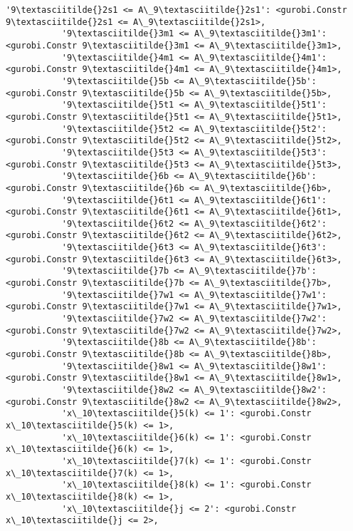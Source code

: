 \documentclass[11pt]{article}
\begin{document}
\begin{Verbatim}[commandchars=\\\{\}]
           '9\textasciitilde{}2s1 <= A\_9\textasciitilde{}2s1': <gurobi.Constr 9\textasciitilde{}2s1 <= A\_9\textasciitilde{}2s1>,
           '9\textasciitilde{}3m1 <= A\_9\textasciitilde{}3m1': <gurobi.Constr 9\textasciitilde{}3m1 <= A\_9\textasciitilde{}3m1>,
           '9\textasciitilde{}4m1 <= A\_9\textasciitilde{}4m1': <gurobi.Constr 9\textasciitilde{}4m1 <= A\_9\textasciitilde{}4m1>,
           '9\textasciitilde{}5b <= A\_9\textasciitilde{}5b': <gurobi.Constr 9\textasciitilde{}5b <= A\_9\textasciitilde{}5b>,
           '9\textasciitilde{}5t1 <= A\_9\textasciitilde{}5t1': <gurobi.Constr 9\textasciitilde{}5t1 <= A\_9\textasciitilde{}5t1>,
           '9\textasciitilde{}5t2 <= A\_9\textasciitilde{}5t2': <gurobi.Constr 9\textasciitilde{}5t2 <= A\_9\textasciitilde{}5t2>,
           '9\textasciitilde{}5t3 <= A\_9\textasciitilde{}5t3': <gurobi.Constr 9\textasciitilde{}5t3 <= A\_9\textasciitilde{}5t3>,
           '9\textasciitilde{}6b <= A\_9\textasciitilde{}6b': <gurobi.Constr 9\textasciitilde{}6b <= A\_9\textasciitilde{}6b>,
           '9\textasciitilde{}6t1 <= A\_9\textasciitilde{}6t1': <gurobi.Constr 9\textasciitilde{}6t1 <= A\_9\textasciitilde{}6t1>,
           '9\textasciitilde{}6t2 <= A\_9\textasciitilde{}6t2': <gurobi.Constr 9\textasciitilde{}6t2 <= A\_9\textasciitilde{}6t2>,
           '9\textasciitilde{}6t3 <= A\_9\textasciitilde{}6t3': <gurobi.Constr 9\textasciitilde{}6t3 <= A\_9\textasciitilde{}6t3>,
           '9\textasciitilde{}7b <= A\_9\textasciitilde{}7b': <gurobi.Constr 9\textasciitilde{}7b <= A\_9\textasciitilde{}7b>,
           '9\textasciitilde{}7w1 <= A\_9\textasciitilde{}7w1': <gurobi.Constr 9\textasciitilde{}7w1 <= A\_9\textasciitilde{}7w1>,
           '9\textasciitilde{}7w2 <= A\_9\textasciitilde{}7w2': <gurobi.Constr 9\textasciitilde{}7w2 <= A\_9\textasciitilde{}7w2>,
           '9\textasciitilde{}8b <= A\_9\textasciitilde{}8b': <gurobi.Constr 9\textasciitilde{}8b <= A\_9\textasciitilde{}8b>,
           '9\textasciitilde{}8w1 <= A\_9\textasciitilde{}8w1': <gurobi.Constr 9\textasciitilde{}8w1 <= A\_9\textasciitilde{}8w1>,
           '9\textasciitilde{}8w2 <= A\_9\textasciitilde{}8w2': <gurobi.Constr 9\textasciitilde{}8w2 <= A\_9\textasciitilde{}8w2>,
           'x\_10\textasciitilde{}5(k) <= 1': <gurobi.Constr x\_10\textasciitilde{}5(k) <= 1>,
           'x\_10\textasciitilde{}6(k) <= 1': <gurobi.Constr x\_10\textasciitilde{}6(k) <= 1>,
           'x\_10\textasciitilde{}7(k) <= 1': <gurobi.Constr x\_10\textasciitilde{}7(k) <= 1>,
           'x\_10\textasciitilde{}8(k) <= 1': <gurobi.Constr x\_10\textasciitilde{}8(k) <= 1>,
           'x\_10\textasciitilde{}j <= 2': <gurobi.Constr x\_10\textasciitilde{}j <= 2>,

\end{Verbatim}
\end{document}
